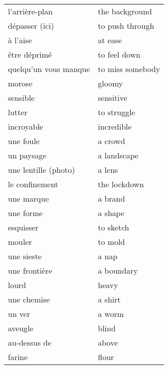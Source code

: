 \documentclass[
  10pt,
]{article}
\begin{document}
\begin{longtable}{ll}
\rowcolor{gray!6}  l'arrière-plan & the background\\

dépasser (ici) & to push through\\

\rowcolor{gray!6}  à l'aise & at ease\\

être déprimé & to feel down\\

\rowcolor{gray!6}  quelqu'un vous manque & to miss somebody\\

morose & gloomy\\

\rowcolor{gray!6}  sensible & sensitive\\

lutter & to struggle\\

\rowcolor{gray!6}  incroyable & incredible\\

une foule & a crowd\\

\rowcolor{gray!6}  un paysage & a landscape\\

une lentille (photo) & a lens\\

\rowcolor{gray!6}  le confinement & the lockdown\\

une marque & a brand\\

\rowcolor{gray!6}  une forme & a shape\\

esquisser & to sketch\\

\rowcolor{gray!6}  mouler & to mold\\

une sieste & a nap\\

\rowcolor{gray!6}  une frontière & a boundary\\

lourd & heavy\\

\rowcolor{gray!6}  une chemise & a shirt\\

un ver & a worm\\

\rowcolor{gray!6}  aveugle & blind\\

au-dessus de & above\\

\rowcolor{gray!6}  farine & flour\\
\bottomrule
\end{longtable}
\end{document}
